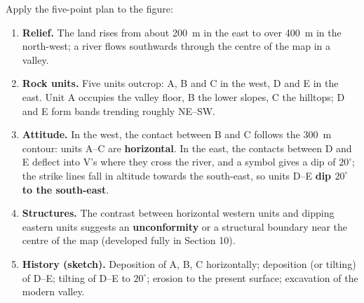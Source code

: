 \documentclass[11pt]{article}
\begin{document}
\begin{experience}
Apply the five-point plan to the figure:
\begin{enumerate}
\item \textbf{Relief.} The land rises from about \SI{200}{m} in the east to over \SI{400}{m} in the north-west; a river flows southwards through the centre of the map in a valley.
\item \textbf{Rock units.} Five units outcrop: A, B and C in the west, D and E in the east. Unit A occupies the valley floor, B the lower slopes, C the hilltops; D and E form bands trending roughly NE--SW.
\item \textbf{Attitude.} In the west, the contact between B and C follows the \SI{300}{m} contour: units A--C are \textbf{horizontal}. In the east, the contacts between D and E deflect into V's where they cross the river, and a symbol gives a dip of $20^\circ$; the strike lines fall in altitude towards the south-east, so units D--E \textbf{dip $20^\circ$ to the south-east}.
\item \textbf{Structures.} The contrast between horizontal western units and dipping eastern units suggests an \textbf{unconformity} or a structural boundary near the centre of the map (developed fully in Section 10).
\item \textbf{History (sketch).} Deposition of A, B, C horizontally; deposition (or tilting) of D--E; tilting of D--E to $20^\circ$; erosion to the present surface; excavation of the modern valley.
\end{enumerate}
\end{experience}
\end{document}
